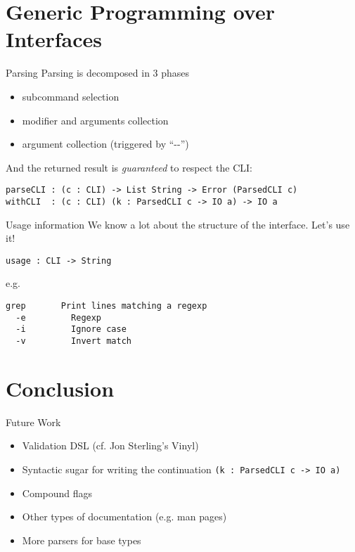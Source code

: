 \documentclass[dvipsnames]{beamer}
\begin{document}
\section{Generic Programming over Interfaces}

\begin{frame}[fragile]{Parsing}
  Parsing is decomposed in 3 phases

  \begin{itemize}
    \item subcommand selection
    \item modifier and arguments collection
    \item argument collection (triggered by ``-{}-'')
  \end{itemize}

  And the returned result is \emph{guaranteed} to respect the CLI:

  \begin{verbatim}
parseCLI : (c : CLI) -> List String -> Error (ParsedCLI c)
withCLI  : (c : CLI) (k : ParsedCLI c -> IO a) -> IO a
  \end{verbatim}
\end{frame}

\begin{frame}[fragile]{Usage information}
We know a lot about the structure of the interface. Let's use it!
\begin{verbatim}
usage : CLI -> String
\end{verbatim}

e.g.

\begin{verbatim}
grep       Print lines matching a regexp
  -e         Regexp
  -i         Ignore case
  -v         Invert match
\end{verbatim}
\end{frame}

\section{Conclusion}
\begin{frame}[fragile]{Future Work}
  \begin{itemize}
    \item Validation DSL (cf. Jon Sterling's Vinyl)
    \item Syntactic sugar for writing the continuation
          \texttt{(k : ParsedCLI c -> IO a)}
    \item Compound flags
    \item Other types of documentation (e.g. man pages)
    \item More parsers for base types
  \end{itemize}
\end{frame}
\end{document}
